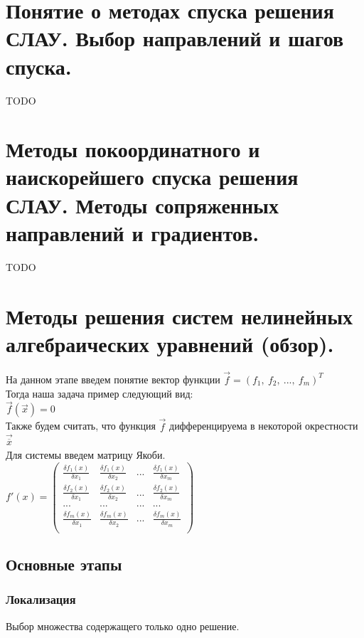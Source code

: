 \documentclass[16pt]{article}
\begin{document}
		\section{Понятие о методах спуска решения СЛАУ. Выбор направлений и шагов спуска.}
			TODO
			
		\section{Методы покоординатного и наискорейшего спуска решения СЛАУ. Методы сопряженных направлений и градиентов.}
			TODO
			
		\section{Методы решения систем нелинейных алгебраических уравнений (обзор).}
			На данном этапе введем понятие вектор функции $\overrightarrow{f} = (f_1,\ f_2,\ ...,\ f_m)^{T}$\\
            Тогда наша задача пример следующий вид:\\
            $\overrightarrow{f}(\overrightarrow{x}) = 0$\\
            Также будем считать, что функция $\overrightarrow{f}$ дифференцируема в некоторой окрестности $\overrightarrow{\overline{x}}$\\
            Для системы введем матрицу Якоби.\\
            $f'(x) = 
            \begin{pmatrix}
                \frac{\delta f_1(x)}{\delta x_1}&\frac{\delta f_1(x)}{\delta x_2}&...&\frac{\delta f_1(x)}{\delta x_m}\\
                \frac{\delta f_2(x)}{\delta x_1}&\frac{\delta f_2(x)}{\delta x_2}&...&\frac{\delta f_2(x)}{\delta x_m}\\
                ...&...&...&...\\
                \frac{\delta f_m(x)}{\delta x_1}&\frac{\delta f_m(x)}{\delta x_2}&...&\frac{\delta f_m(x)}{\delta x_m}\\
            \end{pmatrix}$
            \subsection{Основные этапы}
            \subsubsection{Локализация}
            Выбор множества содержащего только одно решение.
\end{document}
